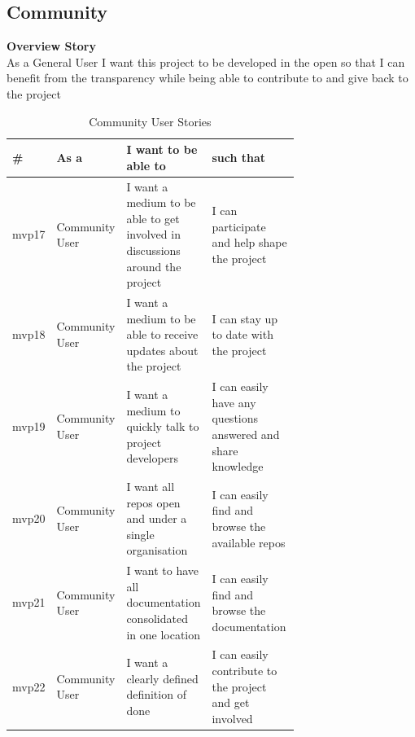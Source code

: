 \subsection{Community}
\label{sub:community}
\textbf{Overview Story}
\\As a General User I want this project to be developed in the open so that I can benefit from the transparency while being able to contribute to and give back to the project
\begin{table}[!ht]
\begin{tabular}{|l|l|p{0.3\linewidth}|p{0.4\linewidth}|}
\hline
\textbf{\#} & \textbf{As a}  & \textbf{I want to be able to}                                                & \textbf{such that}                                           \\ \hline
mvp17       & Community User & I want a medium to be able to get involved in discussions around the project & I can participate and help shape the project                 \\ \hline
mvp18       & Community User & I want a medium to be able to receive updates about the project              & I can stay up to date with the project                       \\ \hline
mvp19       & Community User & I want a medium to quickly talk to project developers                        & I can easily have any questions answered and share knowledge \\ \hline
mvp20       & Community User & I want all repos open and under a single organisation                       & I can easily find and browse the available repos            \\ \hline
mvp21       & Community User & I want to have all documentation consolidated in one location                & I can easily find and browse the documentation               \\ \hline
mvp22       & Community User & I want a clearly defined definition of done                                  & I can easily contribute to the project and get involved      \\ \hline
\end{tabular}
\caption{Community User Stories}
\label{tab:community}
\end{table}

\clearpage
